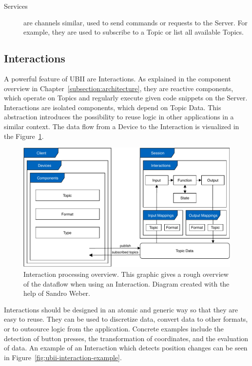\begin{description}
	\item[Services] are channels similar, used to send commands or requests to the Server. For example, they are used to subscribe to a Topic or list all available Topics.
\end{description}


\subsection{Interactions}\label{subsection:interactions}
A powerful feature of \ac{UBII} are Interactions. As explained in the component overview in Chapter~\ref{subsection:architecture}, they are reactive components, which operate on Topics and regularly execute given code snippets on the Server. Interactions are isolated components, which depend on Topic Data. This abstraction introduces the possibility to reuse logic in other applications in a similar context. The data flow from a Device to the Interaction is visualized in the Figure~\ref{fig:ubii-cd}.

\begin{figure}[H]
	\centering
	\includegraphics[width=12cm]{figures/implementation/ubii_cd.pdf}
	\caption[UBII communication diagram]{Interaction processing overview. This graphic gives a rough overview of the dataflow when using an Interaction. Diagram created with the help of Sandro Weber.}\label{fig:ubii-cd}
\end{figure}

Interactions should be designed in an atomic and generic way so that they are easy to reuse. They can be used to discretize data, convert data to other formats, or to outsource logic from the application. Concrete examples include the detection of button presses, the transformation of coordinates, and the evaluation of data. An example of an Interaction which detects position changes can be seen in Figure~\ref{fig:ubii-interaction-example}.

